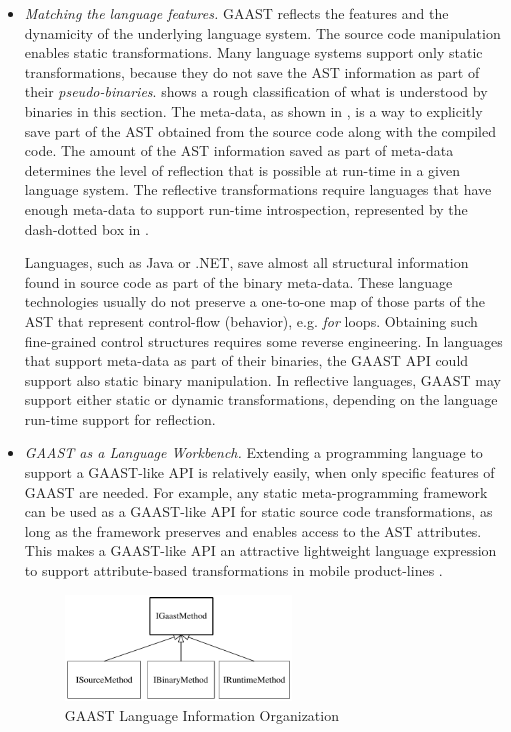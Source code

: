 \begin{itemize}
\item \textit{Matching the language features.} GAAST reflects the features and the dynamicity of the underlying language system. The source code manipulation enables static transformations. Many language systems support only static transformations, because they do not save the AST information as part of their \textit{pseudo-binaries}.  shows a rough classification of what is understood by binaries in this section. The meta-data, as shown in , is a way to explicitly save part of the AST obtained from the source code along with the compiled code. The amount of the AST information saved as part of meta-data determines the level of reflection that is possible at run-time in a given language system. The reflective transformations require languages that have enough meta-data to support run-time introspection, represented by the dash-dotted box in .

Languages, such as Java or .NET, save almost all structural information found in source code as part of the binary meta-data. These language technologies usually do not preserve a one-to-one map of those parts of the AST that represent control-flow (behavior), e.g. \textit{for} loops. Obtaining such fine-grained control structures requires some reverse engineering. 
%
In languages that support meta-data as part of their binaries, the GAAST API could support also static binary manipulation. In reflective languages, GAAST may support either static or dynamic transformations, depending on the language run-time support for reflection.

\item \textit{GAAST as a Language Workbench.} Extending a programming language to support a GAAST-like API is relatively easily, when only specific features of GAAST are needed. For example, any static meta-programming framework can be used as a GAAST-like API for static source code transformations, as long as the framework preserves and enables access to the AST attributes. This makes a GAAST-like API an attractive lightweight language expression to support attribute-based transformations in mobile product-lines .

\begin{figure}[ht]
	\begin{center}
		\includegraphics[width=6cm,height=!]{ch03/native}
	\end{center}
	\caption{GAAST Language Information Organization}
	\label{fig:native}
\end{figure}


\end{itemize}
